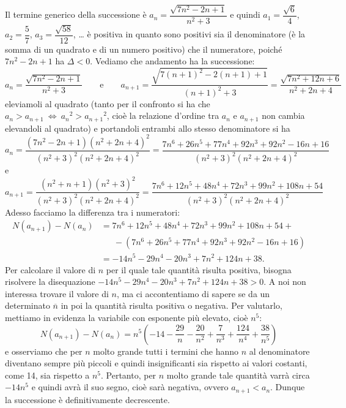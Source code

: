 \begin{exrig}
\begin{esempio}
Il termine generico della successione è $a_n = \dfrac{\sqrt{7n^2-2n+1}}{n^2+3}$ e quindi $a_1=\dfrac{\sqrt{6}}{4}$, $a_2=\dfrac{5}{7}$, $a_3=\dfrac{\sqrt{58}}{12}$, \ldots{} è positiva in quanto sono positivi sia il denominatore (è la somma di un quadrato e di un numero positivo) che il numeratore, poiché $7n^2-2n+1$ ha $\Delta < 0$.
Vediamo che andamento ha la successione:
\[a_n = \dfrac{\sqrt{7n^2-2n+1}}{n^2+3}\qquad\text{e}\qquad a_{n+1} = \dfrac{\sqrt{7(n+1)^2-2(n+1)+1}}{(n+1)^2+3} = \dfrac{\sqrt{7n^2+12n+6}}{n^2+2n+4}\]
eleviamoli al quadrato (tanto per il confronto si ha che $a_n>a_{n+1} \:\Leftrightarrow\: {a_n}^2>{a_{n+1}}^2$, cioè la relazione d'ordine tra $a_n$ e $a_{n+1}$ non cambia elevandoli al quadrato) e portandoli entrambi allo stesso denominatore si ha
\[a_n = \dfrac{(7n^2-2n+1)(n^2+2n+4)^2}{(n^2+3)^2(n^2+2n+4)^2} = \dfrac{7n^6+26n^5+77n^4+92n^3+92n^2−16n+16}{(n^2+3)^2(n^2+2n+4)^2}\]
e
\[a_{n+1} = \dfrac{(n^2+n+1)(n^2+3)^2}{(n^2+3)^2(n^2+2n+4)^2} = \dfrac{7n^6+12n^5+48n^4+72n^3+99n^2+108n+54}{(n^2+3)^2(n^2+2n+4)^2}\]
Adesso facciamo la differenza tra i numeratori:
\begin{align*}
N(a_{n+1})-N(a_n)&=7n^6+12n^5+48n^4+72n^3+99n^2+108n+54+\\ &\phantom{=\,}-\left(7n^6+26n^5+77n^4+92n^3+92n^2−16n+16\right)\\
&=-14n^5-29n^4-20n^3+7n^2+124n+38.
\end{align*}
Per calcolare il valore di $n$ per il quale tale quantità risulta positiva, bisogna risolvere la disequazione $-14n^5-29n^4-20n^3+7n^2+124n+38>0$. A noi non interessa trovare il valore di $n$, ma ci accontentiamo di sapere se da un determinato $\overline{n}$ in poi la quantità risulta positiva o negativa. Per valutarlo, mettiamo in evidenza la variabile con esponente più elevato, cioè $n^5$:
\[N(a_{n+1})-N(a_n)=n^5\left(-14-\frac{29}{n}-\frac{20}{n^2}+\frac{7}{n^3}+\frac{124}{n^4}+\frac{38}{n^5}\right)\]
e osserviamo che per $n$ molto grande tutti i termini che hanno $n$ al denominatore diventano sempre più piccoli e quindi insignificanti sia rispetto ai valori costanti, come 14, sia rispetto a $n^5$. Pertanto, per $n$ molto grande tale quantità varrà circa $-14n^5$ e quindi avrà il suo segno, cioè sarà negativa, ovvero $a_{n+1}<a_n$. Dunque la successione è definitivamente decrescente.
\begin{center}
 
\end{center}
\end{esempio}
\end{exrig}
\vspazio\ovalbox{\risolvii \ref{ese:8a_psucc.1}, \ref{ese:8a_psucc.2}, \ref{ese:8a_psucc.3}, \ref{ese:8a_psucc.4}, \ref{ese:8a_psucc.5}}

